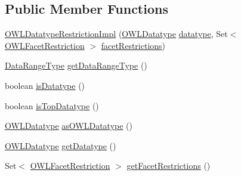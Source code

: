 \subsection*{Public Member Functions}
\begin{DoxyCompactItemize}
\item 
\hyperlink{classuk_1_1ac_1_1manchester_1_1cs_1_1owl_1_1owlapi_1_1_o_w_l_datatype_restriction_impl_ac043b57fc2168f5ed04e2410933e1505}{O\-W\-L\-Datatype\-Restriction\-Impl} (\hyperlink{interfaceorg_1_1semanticweb_1_1owlapi_1_1model_1_1_o_w_l_datatype}{O\-W\-L\-Datatype} \hyperlink{classuk_1_1ac_1_1manchester_1_1cs_1_1owl_1_1owlapi_1_1_o_w_l_datatype_restriction_impl_a9860cd456572420d7a0e0714b0174cfd}{datatype}, Set$<$ \hyperlink{interfaceorg_1_1semanticweb_1_1owlapi_1_1model_1_1_o_w_l_facet_restriction}{O\-W\-L\-Facet\-Restriction} $>$ \hyperlink{classuk_1_1ac_1_1manchester_1_1cs_1_1owl_1_1owlapi_1_1_o_w_l_datatype_restriction_impl_abc383f0b1ca4dc8fa0f63236fc6fc3a0}{facet\-Restrictions})
\item 
\hyperlink{enumorg_1_1semanticweb_1_1owlapi_1_1model_1_1_data_range_type}{Data\-Range\-Type} \hyperlink{classuk_1_1ac_1_1manchester_1_1cs_1_1owl_1_1owlapi_1_1_o_w_l_datatype_restriction_impl_a19913a9a9b593fd5a9c6c1a2a411457e}{get\-Data\-Range\-Type} ()
\item 
boolean \hyperlink{classuk_1_1ac_1_1manchester_1_1cs_1_1owl_1_1owlapi_1_1_o_w_l_datatype_restriction_impl_a02274245489be290fa22e1673d462484}{is\-Datatype} ()
\item 
boolean \hyperlink{classuk_1_1ac_1_1manchester_1_1cs_1_1owl_1_1owlapi_1_1_o_w_l_datatype_restriction_impl_ac591115314a95911c6f24d634a54305a}{is\-Top\-Datatype} ()
\item 
\hyperlink{interfaceorg_1_1semanticweb_1_1owlapi_1_1model_1_1_o_w_l_datatype}{O\-W\-L\-Datatype} \hyperlink{classuk_1_1ac_1_1manchester_1_1cs_1_1owl_1_1owlapi_1_1_o_w_l_datatype_restriction_impl_a62d002378bd0579a320bf1f1fc3f59c5}{as\-O\-W\-L\-Datatype} ()
\item 
\hyperlink{interfaceorg_1_1semanticweb_1_1owlapi_1_1model_1_1_o_w_l_datatype}{O\-W\-L\-Datatype} \hyperlink{classuk_1_1ac_1_1manchester_1_1cs_1_1owl_1_1owlapi_1_1_o_w_l_datatype_restriction_impl_a760a7cf20a1f1d36cf3464d1a8548b26}{get\-Datatype} ()
\item 
Set$<$ \hyperlink{interfaceorg_1_1semanticweb_1_1owlapi_1_1model_1_1_o_w_l_facet_restriction}{O\-W\-L\-Facet\-Restriction} $>$ \hyperlink{classuk_1_1ac_1_1manchester_1_1cs_1_1owl_1_1owlapi_1_1_o_w_l_datatype_restriction_impl_a13ea94dcc810f1069c04f2cac0768103}{get\-Facet\-Restrictions} ()

\end{DoxyCompactItemize}
